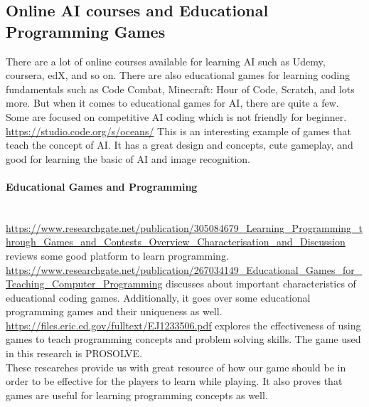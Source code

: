 \subsection{Online AI courses and Educational Programming Games}
There are a lot of online courses available for learning AI such as Udemy, coursera, edX, and so on. There are also educational games for learning coding fundamentals such as Code Combat, Minecraft: Hour of Code, Scratch, and lots more. But when it comes to educational games for AI, there are quite a few. Some are focused on competitive AI coding which is not friendly for beginner. \\
\url{https://studio.code.org/s/oceans/} This is an interesting example of games that teach the concept of AI. It has a great design and concepts, cute gameplay, and good for learning the basic of AI and image recognition. 
\vspace{-5mm}
\paragraph{Educational Games and Programming} ~\\
\url{https://www.researchgate.net/publication/305084679_Learning_Programming_through_Games_and_Contests_Overview_Characterisation_and_Discussion}
reviews some good platform to learn programming. \\[5cm]
\url{https://www.researchgate.net/publication/267034149_Educational_Games_for_Teaching_Computer_Programming} discusses about important characteristics of educational coding games. Additionally, it goes over some educational programming games and their uniqueness as well. \\
\url{https://files.eric.ed.gov/fulltext/EJ1233506.pdf} explores the effectiveness of using games to teach programming concepts and problem solving skills. The game used in this research is PROSOLVE. \\
These researches provide us with great resource of how our game should be in order to be effective for the players to learn while playing. It also proves that games are useful for learning programming concepts as well.